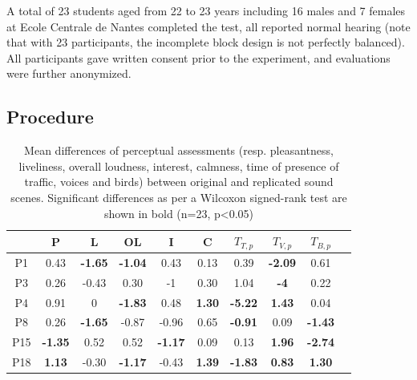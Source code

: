 \documentclass[twocolumn]{article}
\begin{document}
A total of 23 students aged from 22 to 23 years including 16 males and 7 females at Ecole Centrale de Nantes completed the test, all reported normal hearing (note that with 23 participants, the incomplete block design is not perfectly balanced). All participants gave written consent prior to the experiment, and evaluations were further anonymized.

\subsection{Procedure}
\label{sec:exp_proc}

\begin{table}[t!]
\centering
\caption{Mean differences of perceptual assessments (resp. pleasantness, liveliness, overall loudness, interest, calmness, time of presence of traffic, voices and birds) between original and replicated sound scenes. Significant differences as per a Wilcoxon signed-rank test are shown in bold (n=23, p<0.05)}
\label{tab:ogrep}
\begin{tabular}{ c | c c c c c c c c c }
\hline
	 & P & L & OL & I & C & $T_{T, p}$ & $T_{V, p}$ & $T_{B, p}$ \\ \hline
	P1 & 0.43 & \textbf{-1.65} & \textbf{-1.04} & 0.43 & 0.13 & 0.39 & \textbf{-2.09} & 0.61 \\
	P3 & 0.26 & -0.43 & 0.30 & -1 & 0.30 & 1.04 & \textbf{-4} & 0.22 \\
	P4 & 0.91 & 0 & \textbf{-1.83} & 0.48 & \textbf{1.30} & \textbf{-5.22} & \textbf{1.43} & 0.04 \\
	P8 & 0.26 & \textbf{-1.65} & -0.87 & -0.96 & 0.65 & \textbf{-0.91} & 0.09 & \textbf{-1.43} \\
	P15 & \textbf{-1.35} & 0.52 & 0.52 & \textbf{-1.17} & 0.09 & 0.13 & \textbf{1.96} & \textbf{-2.74} \\
	P18 & \textbf{1.13} & -0.30 & \textbf{-1.17} & -0.43 & \textbf{1.39} & \textbf{-1.83} & \textbf{0.83} & \textbf{1.30} \\ \hline
\end{tabular}
\end{table}
\end{document}
